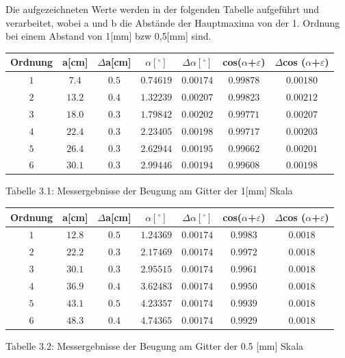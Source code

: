 \documentclass{article}
\begin{document}
Die aufgezeichneten Werte werden in der folgenden Tabelle aufgeführt und verarbeitet, wobei a und b die Abstände der Hauptmaxima von der 1. Ordnung bei einem Abstand von 1[mm] bzw 0,5[mm] sind.

\begin{center}
\begin{tabular}{|c|c|c|c|c|c|c|}

\hline 
Ordnung & a[cm] & \(\Delta \)a[cm] & \(\alpha [^ \circ ] \) & \(\Delta \alpha [^ \circ ] \) & cos(\(\alpha \)+\(\varepsilon \)) & \(\Delta \)cos (\(\alpha \)+\(\varepsilon \)) \\
\hline 
\(1\) &	\(7.4\) &	\(0.5\) &	\(0.74619\) &	\(0.00174\) &	\(0.99878\) &	\(0.00180\)  \\  
\(2\) &	\(13.2\) &	\(0.4\) &	\(1.32239\) &	\(0.00207\) &	\(0.99823\) &	\(0.00212\)  \\  
\(3\) &	\(18.0\) &	\(0.3\) &	\(1.79842\) &	\(0.00202\) &	\(0.99771\) &	\(0.00207\)  \\ 
\(4\) &	\(22.4\) &	\(0.3\) &	\(2.23405\) &	\(0.00198\) &	\(0.99717\) &	\(0.00203\)  \\  
\(5\) &	\(26.4\) &	\(0.3\) &	\(2.62944\) &	\(0.00195\) &	\(0.99662\) &	\(0.00201\)  \\  
\(6\) &	\(30.1\) &	\(0.3\) &	\(2.99446\) &	\(0.00194\) &	\(0.99608\) &	\(0.00198\)  \\  
\hline
\end{tabular}

Tabelle 3.1: Messergebnisse der Beugung am Gitter der 1[mm] Skala 
\end{center}

\vspace{0,5cm}

\begin{center}
\begin{tabular}{|c|c|c|c|c|c|c|}

\hline 
Ordnung & a[cm] & \(\Delta \)a[cm] & \(\alpha [^ \circ ] \) & \(\Delta \alpha [^ \circ ] \) & cos(\(\alpha \)+\(\varepsilon \)) & \(\Delta \)cos (\(\alpha \)+\(\varepsilon \)) \\
\hline 
\(1\) &	\(12.8\) &	\(0.5\) &	\(1.24369\) &	\(0.00174\) &	\(0.9983\) &	\(0.0018\)  \\
\(2\) &	\(22.2\) &	\(0.3\) &	\(2.17469\) &	\(0.00174\) &	\(0.9972\) &	\(0.0018\)  \\
\(3\) &	\(30.1\) &	\(0.3\) &	\(2.95515\) &	\(0.00174\) &	\(0.9961\) &	\(0.0018\)  \\
\(4\) &	\(36.9\) &	\(0.4\) &	\(3.62483\) &	\(0.00174\) &	\(0.9950\) &	\(0.0018\)  \\
\(5\) &	\(43.1\) &	\(0.5\) &	\(4.23357\) &	\(0.00174\) &	\(0.9939\) &	\(0.0018\)  \\
\(6\) &	\(48.3\) &	\(0.4\) &	\(4.74365\) &	\(0.00174\) &	\(0.9929\) &	\(0.0018\)  \\
\hline

\end{tabular}
Tabelle 3.2: Messergebnisse der Beugung am Gitter der 0.5 [mm] Skala
\end{center}
\end{document}

